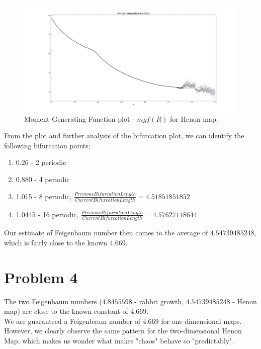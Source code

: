 \documentclass[12pt]{article}\pagestyle{myheadings}
\theoremstyle{plain}
\begin{document}
\begin{figure}[h!]
\centering
\includegraphics[scale=.3]{moment_gen_henon}
\caption{Moment Generating Function plot - $mgf(R)$ for Henon map.}
\label{fig:my_label}
\end{figure}

From the plot and further analysis of the bifurcation plot, we can identify the following bifurcation points: 
\begin{enumerate}
\item 0.26 - 2 periodic
\item 0.880 - 4 periodic
\item 1.015 - 8 periodic, $\frac{PreviousBifurcationLength}{CurrentBifurcationLength} = 4.51851851852$
\item 1.0445 - 16 periodic, $\frac{PreviousBifurcationLength}{CurrentBifurcationLength} = 4.57627118644$
\end{enumerate}

Our estimate of Feigenbaum number then comes to the average of $4.54739485248 $, which is fairly close to the known $4.669$. 

\section{Problem 4}

The two Feigenbaum numbers ($4.8455598$ - rabbit growth, $4.54739485248$ - Henon map) are close to the known constant of $4.669$.\\
We are guaranteed a Feigenbaum number of $4.669$ for one-dimensional maps. However, we clearly observe the same pattern for the two-dimensional Henon Map, which makes us wonder what makes "chaos" behave so "predictably". 
\end{document}
